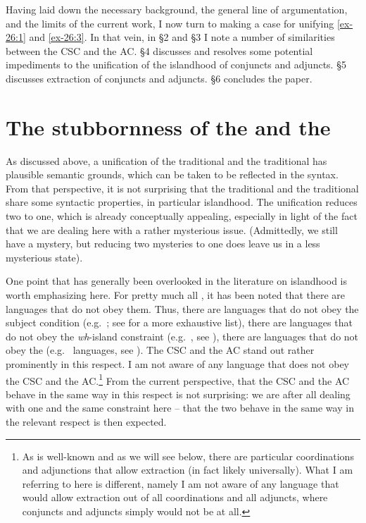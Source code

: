 \documentclass[output=paper]{langsci/langscibook}
\begin{document}
Having laid down the necessary background, the general line of argumentation,
and the limits of the current work, I now turn to making a case for unifying
\eqref{ex-26:1} and \eqref{ex-26:3}. In that vein, in §2 and §3 I note a number of similarities between
the \gls{CSC} and the \glsdesc{AC}. §4 discusses and resolves some potential
impediments to the unification of the islandhood of conjuncts and adjuncts. §5
discusses extraction of conjuncts and adjuncts. §6 concludes the paper.

\section{The stubbornness of the  and the }

As discussed above, a unification of the traditional  and the
traditional  has plausible semantic grounds, which can be taken to be
reflected in the syntax. From that perspective, it is not surprising that the
traditional  and the traditional  share some syntactic
properties, in particular islandhood. The unification reduces two  to
one, which is already conceptually appealing, especially in light of the fact
that we are dealing here with a rather mysterious issue. (Admittedly, we still
have a mystery, but reducing two mysteries to one does leave us in a less
mysterious state).

One point that has generally been overlooked in the literature on islandhood is
worth emphasizing here. For pretty much all , it has been noted that
there are languages that do not obey them. Thus, there are languages that do
not obey the subject condition (e.g.\ ; see \citealt{Stepanov2001b} for
a more exhaustive list), there are languages that do not obey the
\emph{wh}-island constraint (e.g.\ , see \citealt{Engdahl1986}), there
are languages that do not obey the  (e.g.\ 
languages, see \citealt{Boskovic2015}). The \gls{CSC} and the \gls{AC} stand
out rather prominently in this respect. I am not aware of any language that
does not obey the \gls{CSC} and the \gls{AC}.\footnote{As is well-known and as
    we will see below, there are particular coordinations and adjunctions that
    allow extraction (in fact likely universally). What I am referring to here
    is different, namely I am not aware of any language that would allow
extraction out of all coordinations and all adjuncts, where conjuncts and
adjuncts simply would not be  at all.} From the current perspective,
that the \gls{CSC} and the \gls{AC} behave in the same way in this respect is
not surprising: we are after all dealing with one and the same constraint here
-- that the two behave in the same way in the relevant respect is then
expected.
\end{document}
